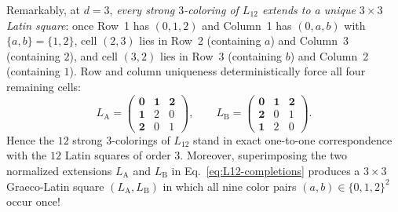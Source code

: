 \documentclass[aps,pra,reprint,superscriptaddress,longbibliography,nofootinbib,floatfix,10pt]{revtex4-2}
\theoremstyle{definition}\newtheorem{definition}[theorem]{Definition}
\theoremstyle{remark}\newtheorem{remark}[theorem]{Remark}
\begin{document}
Remarkably, at $d=3$, \emph{every strong $3$-coloring of $L_{12}$ extends to a unique $3\times 3$ Latin square}: once Row~1 has $(0,1,2)$ and Column~1 has $(0,a,b)$ with $\{a,b\}=\{1,2\}$, cell $(2,3)$ lies in Row~2 (containing $a$) and Column~3 (containing $2$), and cell $(3,2)$ lies in Row~3 (containing $b$) and Column~2 (containing $1$). Row and column uniqueness deterministically force all four remaining cells:
\begin{equation}\label{eq:L12-completions}
L_{\mathrm{A}}=\begin{pmatrix}
\mathbf{0} & \mathbf{1} & \mathbf{2}\\
\mathbf{1} & 2 & 0\\
\mathbf{2} & 0 & 1
\end{pmatrix},\qquad
L_{\mathrm{B}}=\begin{pmatrix}
\mathbf{0} & \mathbf{1} & \mathbf{2}\\
\mathbf{2} & 0 & 1\\
\mathbf{1} & 2 & 0
\end{pmatrix}.
\end{equation}
Hence the $12$ strong $3$-colorings of $L_{12}$ stand in exact one-to-one correspondence with the $12$ Latin squares of order $3$. Moreover, superimposing the two normalized extensions $L_{\mathrm{A}}$ and $L_{\mathrm{B}}$ in Eq.~\eqref{eq:L12-completions} produces a $3\times 3$ Graeco-Latin square $(L_{\mathrm{A}},L_{\mathrm{B}})$ in which all nine color pairs $(a,b)\in\{0,1,2\}^2$ occur once!
\end{document}
